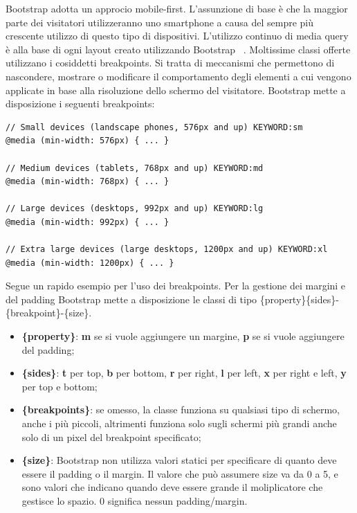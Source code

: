 \noindent Bootstrap adotta un approcio mobile-first.
L'assunzione di base è che la maggior parte dei visitatori utilizzeranno uno smartphone a causa del sempre più crescente utilizzo di questo tipo di dispositivi.\newline
L'utilizzo continuo di media query è alla base di ogni layout creato utilizzando Bootstrap ~\cite{bootstrap}. \newline Moltissime classi offerte utilizzano i cosiddetti breakpoints. Si tratta di meccanismi che permettono di nascondere, mostrare o modificare il comportamento degli elementi a cui vengono applicate in base alla risoluzione dello schermo del visitatore.
Bootstrap mette a disposizione i seguenti breakpoints:
\begin{verbatim}
// Small devices (landscape phones, 576px and up) KEYWORD:sm
@media (min-width: 576px) { ... }

// Medium devices (tablets, 768px and up) KEYWORD:md
@media (min-width: 768px) { ... }

// Large devices (desktops, 992px and up) KEYWORD:lg
@media (min-width: 992px) { ... }

// Extra large devices (large desktops, 1200px and up) KEYWORD:xl
@media (min-width: 1200px) { ... } 
\end{verbatim}
\noindent Segue un rapido esempio per l'uso dei breakpoints. Per la gestione dei margini e del padding Bootstrap mette a disposizione le classi di tipo \{property\}\{sides\}-\{breakpoint\}-\{size\}.
\begin{itemize}
    \item \textbf{\{property\}}: \textbf{m} se si vuole aggiungere un margine, \textbf{p} se si vuole aggiungere del padding;
    \item \textbf{{\{sides\}}}: \textbf{t} per top, \textbf{b} per bottom, \textbf{r} per right, \textbf{l} per left, \textbf{x} per right e left, \textbf{y} per top e bottom;
    \item \textbf{\{breakpoints\}}: se omesso, la classe funziona su qualsiasi tipo di schermo, anche i più piccoli, altrimenti funziona solo sugli schermi più grandi anche solo di un pixel del breakpoint specificato;
    \item \textbf{\{size\}}: Bootstrap non utilizza valori statici per specificare di quanto deve essere il padding o il margin. Il valore che può assumere size va da 0 a 5, e sono valori che indicano quando deve essere grande il moliplicatore che gestisce lo spazio. 0 significa nessun padding/margin.
    
\end{itemize}
